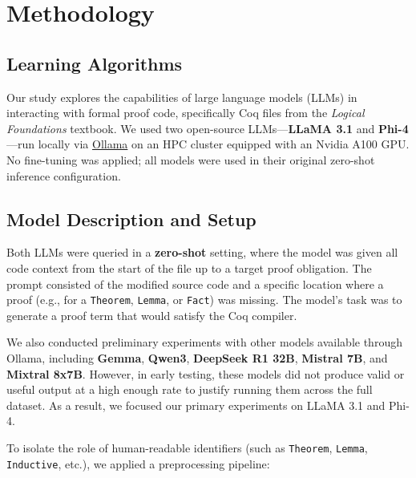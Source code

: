 
\section{Methodology}
\label{sec:methodology}
\subsection{Learning Algorithms}

Our study explores the capabilities of large language models (LLMs) in interacting with formal proof code, specifically Coq files from the \textit{Logical Foundations} textbook. We used two open-source LLMs---\textbf{LLaMA 3.1} \cite{grattafiori2024llama3herdmodels} and \textbf{Phi-4} \cite{abdin2025phi4reasoningtechnicalreport}---run locally via \href{https://ollama.com}{Ollama} on an HPC cluster equipped with an Nvidia A100 GPU. No fine-tuning was applied; all models were used in their original zero-shot inference configuration.

\subsection{Model Description and Setup}

Both LLMs were queried in a \textbf{zero-shot} setting, where the model was given all code context from the start of the file up to a target proof obligation. The prompt consisted of the modified source code and a specific location where a proof (e.g., for a \texttt{Theorem}, \texttt{Lemma}, or \texttt{Fact}) was missing. The model's task was to generate a proof term that would satisfy the Coq compiler.

We also conducted preliminary experiments with other models available through Ollama, including \textbf{Gemma}, \textbf{Qwen3}, \textbf{DeepSeek R1 32B}, \textbf{Mistral 7B}, and \textbf{Mixtral 8x7B}. However, in early testing, these models did not produce valid or useful output at a high enough rate to justify running them across the full dataset. As a result, we focused our primary experiments on LLaMA 3.1 and Phi-4.

To isolate the role of human-readable identifiers (such as \texttt{Theorem}, \texttt{Lemma}, \texttt{Inductive}, etc.), we applied a preprocessing pipeline:

